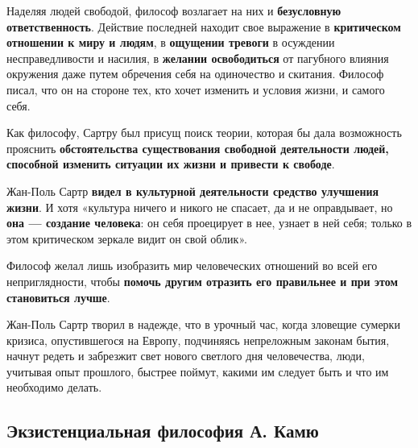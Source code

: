 \documentclass{article}
\begin{document}
\begin{flushleft}
\hfill

Наделяя людей свободой, философ возлагает на них и \textbf{безусловную ответственность}. Действие последней находит свое выражение в \textbf{критическом отношении к миру и людям}, в \textbf{ощущении тревоги} в осуждении несправедливости и насилия, в \textbf{желании освободиться} от пагубного влияния окружения даже путем обречения себя на одиночество и скитания. Философ писал, что он на стороне тех, кто хочет изменить и условия жизни, и самого себя.

\hfill

Как философу, Сартру был присущ поиск теории, которая бы дала возможность прояснить \textbf{обстоятельства существования свободной деятельности людей, способной изменить ситуации их жизни и привести к свободе}.

\hfill

Жан-Поль Сартр \textbf{видел в культурной деятельности средство улучшения жизни}. И хотя «культура ничего и никого не спасает, да и не оправдывает, но \textbf{она — создание человека}: он себя проецирует в нее, узнает в ней себя; только в этом критическом зеркале видит он свой облик». 

Философ желал лишь изобразить мир человеческих отношений во всей его неприглядности, чтобы \textbf{помочь другим отразить его правильнее и при этом становиться лучше}.

Жан-Поль Сартр творил в надежде, что в урочный час, когда зловещие сумерки кризиса, опустившегося на Европу, подчиняясь непреложным законам бытия, начнут редеть и забрезжит свет нового светлого дня человечества, люди, учитывая опыт прошлого, быстрее поймут, какими им следует быть и что им необходимо делать.

\end{flushleft}


\subsection{Экзистенциальная философия А. Камю}
\end{document}
